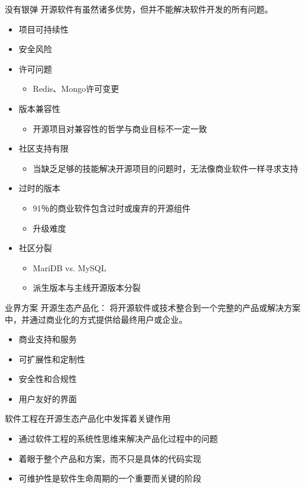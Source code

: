 \documentclass{beamer}
\begin{document}
\begin{frame}[label={sec:orge9ddf51}]{没有银弹}
开源软件有虽然诸多优势，但并不能解决软件开发的所有问题。
\begin{itemize}
\item 项目可持续性
\item 安全风险
\item 许可问题
\begin{itemize}
\item Redis、Mongo许可变更
\end{itemize}
\item 版本兼容性
\begin{itemize}
\item 开源项目对兼容性的哲学与商业目标不一定一致
\end{itemize}
\item 社区支持有限
\begin{itemize}
\item 当缺乏足够的技能解决开源项目的问题时，无法像商业软件一样寻求支持
\end{itemize}
\item 过时的版本
\begin{itemize}
\item 91％的商业软件包含过时或废弃的开源组件
\item 升级难度
\end{itemize}
\item 社区分裂
\begin{itemize}
\item MariDB vs. MySQL
\item 派生版本与主线开源版本分裂
\end{itemize}
\end{itemize}
\end{frame}

\begin{frame}[label={sec:org343f85b}]{业界方案}
开源生态产品化：
将开源软件或技术整合到一个完整的产品或解决方案中，并通过商业化的方式提供给最终用户或企业。
\begin{itemize}
\item 商业支持和服务
\item 可扩展性和定制性
\item 安全性和合规性
\item 用户友好的界面
\end{itemize}

软件工程在开源生态产品化中发挥着关键作用
\begin{itemize}
\item 通过软件工程的系统性思维来解决产品化过程中的问题
\item 着眼于整个产品和方案，而不只是具体的代码实现
\item 可维护性是软件生命周期的一个重要而关键的阶段
\end{itemize}
\end{frame}
\end{document}
